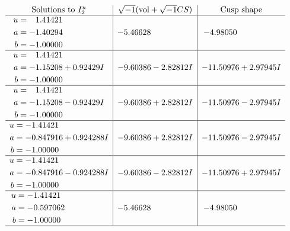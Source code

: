 \documentclass[1p]{elsarticle_modified}
\theoremstyle{definition}
\newcommand{\I}{\sqrt{-1}}
\begin{document}
$$\begin{array}{c|c|c}  
\text{Solutions to }I^u_{2}& \I (\text{vol} + \sqrt{-1}CS) & \text{Cusp shape}\\
 \hline 
\begin{aligned}
u &= \phantom{-}1.41421\phantom{ +0.000000I} \\
a &= -1.40294\phantom{ +0.000000I} \\
b &= -1.00000\phantom{ +0.000000I}\end{aligned}
 & -5.46628\phantom{ +0.000000I} & -4.98050\phantom{ +0.000000I} \\ \hline\begin{aligned}
u &= \phantom{-}1.41421\phantom{ +0.000000I} \\
a &= -1.15208 + 0.92429 I \\
b &= -1.00000\phantom{ +0.000000I}\end{aligned}
 & -9.60386 - 2.82812 I & -11.50976 + 2.97945 I \\ \hline\begin{aligned}
u &= \phantom{-}1.41421\phantom{ +0.000000I} \\
a &= -1.15208 - 0.92429 I \\
b &= -1.00000\phantom{ +0.000000I}\end{aligned}
 & -9.60386 + 2.82812 I & -11.50976 - 2.97945 I \\ \hline\begin{aligned}
u &= -1.41421\phantom{ +0.000000I} \\
a &= -0.847916 + 0.924288 I \\
b &= -1.00000\phantom{ +0.000000I}\end{aligned}
 & -9.60386 + 2.82812 I & -11.50976 - 2.97945 I \\ \hline\begin{aligned}
u &= -1.41421\phantom{ +0.000000I} \\
a &= -0.847916 - 0.924288 I \\
b &= -1.00000\phantom{ +0.000000I}\end{aligned}
 & -9.60386 - 2.82812 I & -11.50976 + 2.97945 I \\ \hline\begin{aligned}
u &= -1.41421\phantom{ +0.000000I} \\
a &= -0.597062\phantom{ +0.000000I} \\
b &= -1.00000\phantom{ +0.000000I}\end{aligned}
 & -5.46628\phantom{ +0.000000I} & -4.98050\phantom{ +0.000000I}\\
 \hline 
 \end{array}$$\newpage\newpage\renewcommand{\arraystretch}{1}
\end{document}
